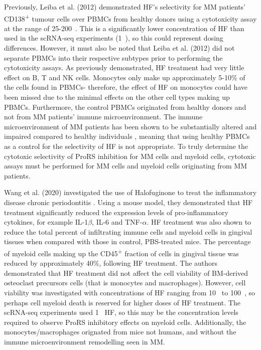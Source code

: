 Previously, Leiba et al. (2012) demonstrated HF's selectivity for MM patients' CD138\textsuperscript{+} tumour cells over PBMCs from healthy donors \cite{leiba2012halofuginone} using a cytotoxicity assay at the range of 25-200\si{\nano\Molar}.
This is a significantly lower concentration of HF than used in the scRNA-seq experiments (1\si{\micro\Molar}), so this could represent dosing differences.
However, it must also be noted that Leiba et al. (2012) did not separate PBMCs into their respective subtypes prior to performing the cytotoxicity assays.
As previously demonstrated, HF treatment had very little effect on B, T and NK cells.
Monocytes only make up approximately 5-10\% of the cells found in PBMCs- therefore, the effect of HF on monocytes could have been missed due to the minimal effects on the other cell types making up PBMCs.
Furthermore, the control PBMCs originated from healthy donors and not from MM patients' immune microenvironment.
The immune microenvironment of MM patients has been shown to be substantially altered and impaired compared to healthy individuals \cite{de2013analysis}, meaning that using healthy PBMCs as a control for the selectivity of HF is not appropriate.
To truly determine the cytotoxic selectivity of ProRS inhibition for MM cells and myeloid cells, cytotoxic assays must be performed for MM cells and myeloid cells originating from MM patients.

Wang et al. (2020) investigated the use of Halofuginone to treat the inflammatory disease chronic periodontitis \cite{wang2020halofuginone}.
Using a mouse model, they demonstrated that HF treatment significantly reduced the expression levels of pro-inflammatory cytokines, for example IL-1$\beta$, IL-6 and TNF-$\alpha$.
HF treatment was also shown to reduce the total percent of infiltrating immune cells and myeloid cells in gingival tissues when compared with those in control, PBS-treated mice.
The percentage of myeloid cells making up the CD45\textsuperscript{+} fraction of cells in gingival tissue was reduced by approximately 40\%, following HF treatment.
The authors demonstrated that HF treatment did not affect the cell viability of BM-derived osteoclast precursors cells (that is monocytes and macrophages).
However, cell viability was investigated with concentrations of HF ranging from 10\si{\pico\Molar} to 100\si{\nano\Molar}, so perhaps cell myeloid death is reserved for higher doses of HF treatment.
The scRNA-seq experiments used 1\si{\micro\Molar} HF, so this may be the concentration levels required to observe ProRS inhibitory effects on myeloid cells.
Additionally, the monocytes/macrophages orignated from mice not humans, and without the immune microenvironment remodelling seen in MM\@.


